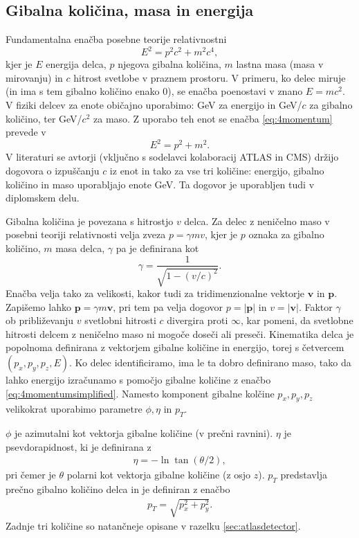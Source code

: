 \documentclass[11pt,a4paper,openany]{book}
\begin{document}
\subsection{Gibalna količina, masa in energija}
Fundamentalna enačba posebne teorije relativnostni
\begin{equation}
	E^2 = p^2c^2 + m^2c^4,
	\label{eq:4momentum}
\end{equation}
kjer je $E$ energija delca, $p$ njegova gibalna količina, $m$ lastna masa (masa v mirovanju) in $c$ hitrost svetlobe v praznem prostoru. V primeru, ko delec miruje (in ima s tem gibalno količino enako $0$), se enačba poenostavi v znano $E = mc^2$. V fiziki delcev za enote običajno uporabimo: GeV za energijo in GeV/$c$ za gibalno količino, ter GeV/$c^2$ za maso. Z uporabo teh enot se enačba \ref{eq:4momentum} prevede v 
\begin{equation}
	E^2 = p^2 + m^2.
	\label{eq:4momentumsimplified}
\end{equation}
V literaturi se avtorji (vključno s sodelavci kolaboracij ATLAS in CMS) držijo dogovora o izpuščanju $c$ iz enot in tako za vse tri količine: energijo, gibalno količino in maso uporabljajo enote GeV. Ta dogovor je uporabljen tudi v diplomskem delu.

Gibalna količina je povezana s hitrostjo $v$ delca. Za delec z neničelno maso v posebni teoriji relativnosti velja zveza $p = \gamma m v$, kjer je $p$ oznaka za gibalno količino, $m$ masa delca, $\gamma$ pa je definirana kot
\begin{equation}
	\gamma = \frac{1}{\sqrt{1 - (v/c)^2}}.
	\label{eq:gamma}
\end{equation}
Enačba velja tako za velikosti, kakor tudi za tridimenzionalne vektorje $\mathbf{v}$ in $\mathbf{p}$. Zapišemo lahko $\mathbf{p} = \gamma m \mathbf{v}$, pri tem pa velja dogovor $p = |\mathbf{p}|$ in $v = |\mathbf{v}|$. Faktor $\gamma$ ob približevanju $v$ svetlobni hitrosti $c$ divergira proti $\infty$, kar pomeni, da svetlobne hitrosti delcem z neničelno maso ni mogoče doseči ali preseči. Kinematika delca je popolnoma definirana z vektorjem gibalne količine in energijo, torej s četvercem $(p_x, p_y, p_z, E)$. Ko delec identificiramo, ima le ta dobro definirano maso, tako da lahko energijo izračunamo s pomočjo gibalne količine z enačbo \ref{eq:4momentumsimplified}. Namesto komponent gibalne kolčine $p_x, p_y, p_z$ velikokrat uporabimo parametre $\phi, \eta$ in $p_T$.

$\phi$ je azimutalni kot vektorja gibalne količine (v prečni ravnini). $\eta$ je psevdorapidnost, ki je definirana z
\begin{eqnarray}
	\eta = -\ln \tan(\theta/2),
	\label{eq:pseudorapidity}
\end{eqnarray}
pri čemer je $\theta$ polarni kot vektorja gibalne količine (z osjo $z$). $p_T$ predstavlja prečno gibalno količino delca in je definiran z enačbo
\begin{eqnarray}
	p_T = \sqrt{p_x^2 + p_y^2}.
	\label{eq:transversemomentum}
\end{eqnarray}
Zadnje tri količine so natančneje opisane v razelku \ref{sec:atlasdetector}.
\end{document}
